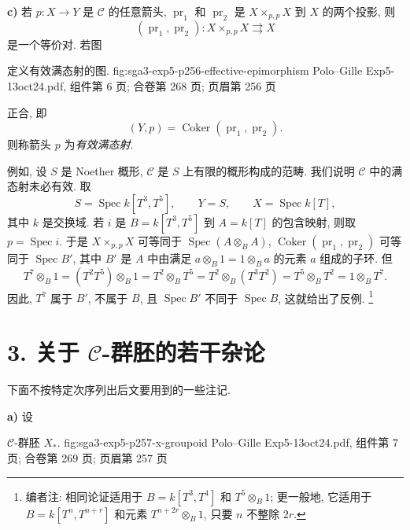 \medskip
{}\label{par:sga3-V-2-c}%
\noindent\textbf{c)} 若 \(p:X\to Y\) 是 \(\mathscr C\) 的任意箭头,
\(\operatorname{pr}_1\) 和 \(\operatorname{pr}_2\) 是
\(X\times_{p,p}X\) 到 \(X\) 的两个投影, 则
\[
  (\operatorname{pr}_1,\operatorname{pr}_2):
  X\times_{p,p}X\rightrightarrows X
\]
是一个等价对. 若图

  {定义有效满态射的图.}
  {fig:sga3-exp5-p256-effective-epimorphism}
  {Polo--Gille Exp5-13oct24.pdf, 组件第 6 页; 合卷第 268 页; 页眉第 256 页}

\noindent 正合, 即
\[
  (Y,p)=\operatorname{Coker}(\operatorname{pr}_1,\operatorname{pr}_2).
\]
则称箭头 \(p\) 为\emph{有效满态射}.

例如, 设 \(S\) 是 Noether 概形, \(\mathscr C\) 是
\(S\) 上有限的概形构成的范畴. 我们说明 \(\mathscr C\)
中的满态射未必有效. 取
\[
  S=\operatorname{Spec}k[T^3,T^5],\qquad
  Y=S,\qquad X=\operatorname{Spec}k[T],
\]
其中 \(k\) 是交换域. 若 \(i\) 是 \(B=k[T^3,T^5]\)
到 \(A=k[T]\) 的包含映射, 则取 \(p=\operatorname{Spec}i\).
于是 \(X\times_{p,p}X\) 可等同于 \(\operatorname{Spec}(A\otimes_B A)\),
\(\operatorname{Coker}(\operatorname{pr}_1,\operatorname{pr}_2)\)
可等同于 \(\operatorname{Spec}B'\), 其中 \(B'\) 是 \(A\)
中由满足 \(a\otimes_B1=1\otimes_Ba\) 的元素 \(a\) 组成的子环. 但
\[
  T^7\otimes_B1
  =(T^2T^5)\otimes_B1
  =T^2\otimes_BT^5
  =T^2\otimes_B(T^3T^2)
  =T^5\otimes_BT^2
  =1\otimes_BT^7.
\]
因此, \(T^7\) 属于 \(B'\), 不属于 \(B\), 且
\(\operatorname{Spec}B'\) 不同于 \(\operatorname{Spec}B\),
这就给出了反例.%
\footnote{\label{note:sga3-V-10}编者注: 相同论证适用于
\(B=k[T^3,T^4]\) 和 \(T^5\otimes_B1\);
更一般地, 它适用于 \(B=k[T^n,T^{n+r}]\) 和元素
\(T^{n+2r}\otimes_B1\), 只要 \(n\) 不整除 \(2r\).}

\section*{3. 关于 \(\mathscr C\)-群胚的若干杂论}
\label{sec:sga3-V-3}

下面不按特定次序列出后文要用到的一些注记.

\medskip
{}\label{par:sga3-V-3-a}%
\noindent\textbf{a)} 设

  {\(\mathscr C\)-群胚 \(X_\ast\).}
  {fig:sga3-exp5-p257-x-groupoid}
  {Polo--Gille Exp5-13oct24.pdf, 组件第 7 页; 合卷第 269 页; 页眉第 257 页}

